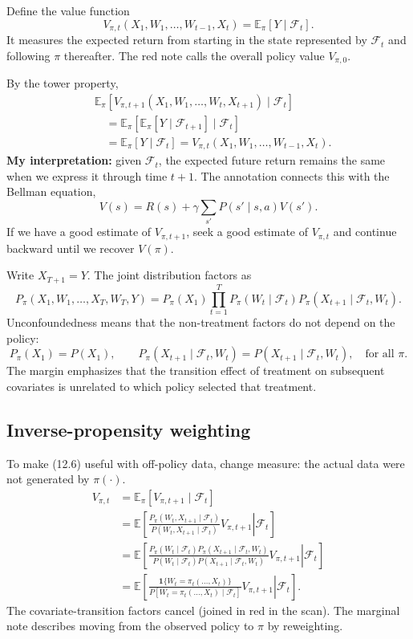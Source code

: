 Define the value function
\[
 V_{\pi,t}(X_1,W_1,\ldots,W_{t-1},X_t)
 =\mathbb E_\pi[Y\mid\mathcal F_t].
\]
It measures the expected return from starting in the state represented by $\mathcal F_t$ and following $\pi$ thereafter. The red note calls the overall policy value $V_{\pi,0}$.

By the tower property,
\begin{align*}
 &\mathbb E_\pi[V_{\pi,t+1}(X_1,W_1,\ldots,W_t,X_{t+1})\mid\mathcal F_t]\\
 &\quad=\mathbb E_\pi[\mathbb E_\pi[Y\mid\mathcal F_{t+1}]\mid\mathcal F_t]\\
 &\quad=\mathbb E_\pi[Y\mid\mathcal F_t]
 =V_{\pi,t}(X_1,W_1,\ldots,W_{t-1},X_t).\tag{12.6}
\end{align*}
\textbf{My interpretation:} given $\mathcal F_t$, the expected future return remains the same when we express it through time $t+1$. The annotation connects this with the Bellman equation,
\[
 V(s)=R(s)+\gamma\sum_{s'}P(s'\mid s,a)V(s').
\]
If we have a good estimate of $V_{\pi,t+1}$, seek a good estimate of $V_{\pi,t}$ and continue backward until we recover $V(\pi)$.

Write $X_{T+1}=Y$. The joint distribution factors as
\[
 P_\pi(X_1,W_1,\ldots,X_T,W_T,Y)
 =P_\pi(X_1)\prod_{t=1}^T
 P_\pi(W_t\mid\mathcal F_t)
 P_\pi(X_{t+1}\mid\mathcal F_t,W_t).
\]
Unconfoundedness means that the non-treatment factors do not depend on the policy:
\[
 P_\pi(X_1)=P(X_1),\qquad
 P_\pi(X_{t+1}\mid\mathcal F_t,W_t)
 =P(X_{t+1}\mid\mathcal F_t,W_t),\quad\text{for all }\pi.
\]
The margin emphasizes that the transition effect of treatment on subsequent covariates is unrelated to which policy selected that treatment.

\subsection{Inverse-propensity weighting}
To make (12.6) useful with off-policy data, change measure: the actual data were not generated by $\pi(\cdot)$.
\begin{align*}
 V_{\pi,t}
 &=\mathbb E_\pi[V_{\pi,t+1}\mid\mathcal F_t]\\
 &=\mathbb E\left[\left.
 \frac{P_\pi(W_t,X_{t+1}\mid\mathcal F_t)}
 {P(W_t,X_{t+1}\mid\mathcal F_t)}V_{\pi,t+1}
 \right|\mathcal F_t\right]\\
 &=\mathbb E\left[\left.
 \frac{P_\pi(W_t\mid\mathcal F_t)P_\pi(X_{t+1}\mid\mathcal F_t,W_t)}
 {P(W_t\mid\mathcal F_t)P(X_{t+1}\mid\mathcal F_t,W_t)}
 V_{\pi,t+1}\right|\mathcal F_t\right]\\
 &=\mathbb E\left[\left.
 \frac{\mathbf1\{W_t=\pi_t(\ldots,X_t)\}}
 {P[W_t=\pi_t(\ldots,X_t)\mid\mathcal F_t]}
 V_{\pi,t+1}\right|\mathcal F_t\right].
\end{align*}
The covariate-transition factors cancel (joined in red in the scan). The marginal note describes moving from the observed policy to $\pi$ by reweighting.

